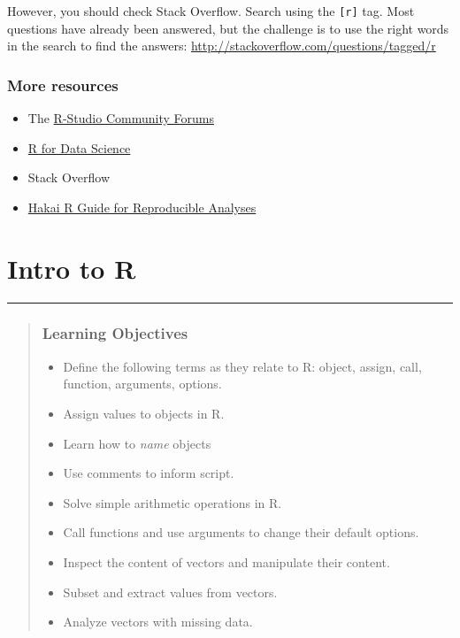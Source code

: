 \documentclass[]{book}
\providecommand{\tightlist}{%
  \setlength{\itemsep}{0pt}\setlength{\parskip}{0pt}}
\begin{document}
However, you should check Stack Overflow. Search using the
\texttt{{[}r{]}} tag. Most questions have already been answered, but the
challenge is to use the right words in the search to find the answers:
\url{http://stackoverflow.com/questions/tagged/r}

\subsection{More resources}\label{more-resources}

\begin{itemize}
\tightlist
\item
  The \href{https://community.rstudio.com/}{R-Studio Community Forums}
\item
  \href{http://r4ds.had.co.nz}{R for Data Science}
\item
  Stack Overflow
\item
  \href{http://hecate.hakai.org/rguide}{Hakai R Guide for Reproducible
  Analyses}
\end{itemize}

\chapter{Intro to R}\label{intro-to-r}

\begin{center}\rule{0.5\linewidth}{\linethickness}\end{center}

\begin{quote}
\subsection{Learning Objectives}\label{learning-objectives-1}

\begin{itemize}
\tightlist
\item
  Define the following terms as they relate to R: object, assign, call,
  function, arguments, options.
\item
  Assign values to objects in R.
\item
  Learn how to \emph{name} objects
\item
  Use comments to inform script.
\item
  Solve simple arithmetic operations in R.
\item
  Call functions and use arguments to change their default options.
\item
  Inspect the content of vectors and manipulate their content.
\item
  Subset and extract values from vectors.
\item
  Analyze vectors with missing data.
\end{itemize}
\end{quote}
\end{document}

